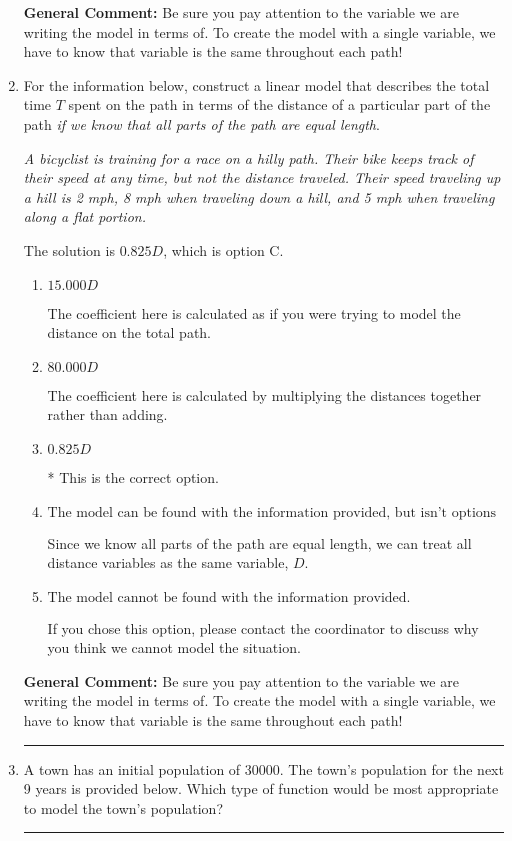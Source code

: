 \documentclass{extbook}[14pt]
\newcommand{\litem}[1]{\item #1

\rule{\textwidth}{0.4pt}}
\begin{document}
\begin{enumerate}
{\textbf{General Comment:} Be sure you pay attention to the variable we are writing the model in terms of. To create the model with a single variable, we have to know that variable is the same throughout each path!
}
\litem{
For the information below, construct a linear model that describes the total time $T$ spent on the path in terms of the distance of a particular part of the path \textit{if we know that all parts of the path are equal length}.

\begin{center}
    \textit{ A bicyclist is training for a race on a hilly path. Their bike keeps track of their speed at any time, but not the distance traveled. Their speed traveling up a hill is 2 mph, 8 mph when traveling down a hill, and 5 mph when traveling along a flat portion. }
\end{center}
The solution is \( 0.825 D \), which is option C.\begin{enumerate}[label=\Alph*.]
\item \( 15.000 D \)

The coefficient here is calculated as if you were trying to model the distance on the total path.
\item \( 80.000 D \)

The coefficient here is calculated by multiplying the distances together rather than adding.
\item \( 0.825 D \)

* This is the correct option.
\item \( \text{The model can be found with the information provided, but isn't options 1-3.} \)

Since we know all parts of the path are equal length, we can treat all distance variables as the same variable, $D$.
\item \( \text{The model cannot be found with the information provided.} \)

If you chose this option, please contact the coordinator to discuss why you think we cannot model the situation.
\end{enumerate}

\textbf{General Comment:} Be sure you pay attention to the variable we are writing the model in terms of. To create the model with a single variable, we have to know that variable is the same throughout each path!
}
\litem{
A town has an initial population of 30000. The town's population for the next 9 years is provided below. Which type of function would be most appropriate to model the town's population?


}
\end{enumerate}
\end{document}
